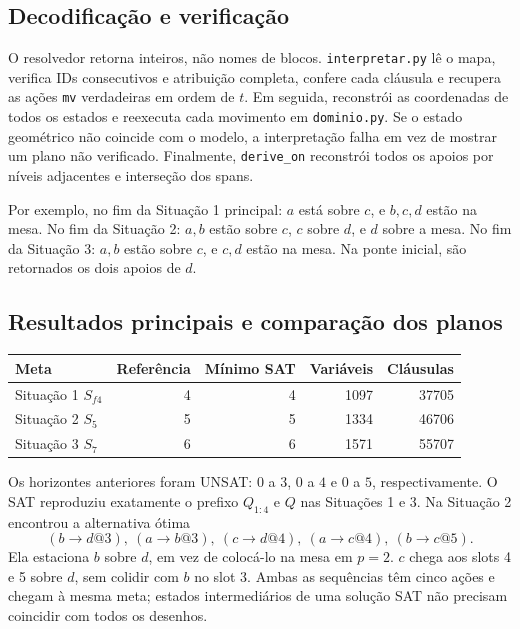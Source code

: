 \documentclass[11pt,a4paper]{article}
\begin{document}
\subsection{Decodificação e verificação}
O resolvedor retorna inteiros, não nomes de blocos. \texttt{interpretar.py} lê o mapa, verifica IDs consecutivos e atribuição completa, confere cada cláusula e recupera as ações \texttt{mv} verdadeiras em ordem de $t$. Em seguida, reconstrói as coordenadas de todos os estados e reexecuta cada movimento em \texttt{dominio.py}. Se o estado geométrico não coincide com o modelo, a interpretação falha em vez de mostrar um plano não verificado. Finalmente, \texttt{derive\_on} reconstrói todos os apoios por níveis adjacentes e interseção dos spans.

Por exemplo, no fim da Situação 1 principal: $a$ está sobre $c$, e $b,c,d$ estão na mesa. No fim da Situação 2: $a,b$ estão sobre $c$, $c$ sobre $d$, e $d$ sobre a mesa. No fim da Situação 3: $a,b$ estão sobre $c$, e $c,d$ estão na mesa. Na ponte inicial, são retornados os dois apoios de $d$.

\subsection{Resultados principais e comparação dos planos}
\begin{center}\small
\begin{tabular}{@{}lrrrr@{}}\toprule
Meta & Referência & Mínimo SAT & Variáveis & Cláusulas\\\midrule
Situação 1 $S_{f4}$ & 4 & 4 & 1097 & 37705\\
Situação 2 $S_5$ & 5 & 5 & 1334 & 46706\\
Situação 3 $S_7$ & 6 & 6 & 1571 & 55707\\\bottomrule
\end{tabular}\end{center}
Os horizontes anteriores foram UNSAT: $0$ a $3$, $0$ a $4$ e $0$ a $5$, respectivamente. O SAT reproduziu exatamente o prefixo $Q_{1:4}$ e $Q$ nas Situações 1 e 3. Na Situação 2 encontrou a alternativa ótima
\[
(b\to d@3),\ (a\to b@3),\ (c\to d@4),\ (a\to c@4),\ (b\to c@5).
\]
Ela estaciona $b$ sobre $d$, em vez de colocá-lo na mesa em $p=2$. $c$ chega aos slots 4 e 5 sobre $d$, sem colidir com $b$ no slot 3. Ambas as sequências têm cinco ações e chegam à mesma meta; estados intermediários de uma solução SAT não precisam coincidir com todos os desenhos.
\end{document}
